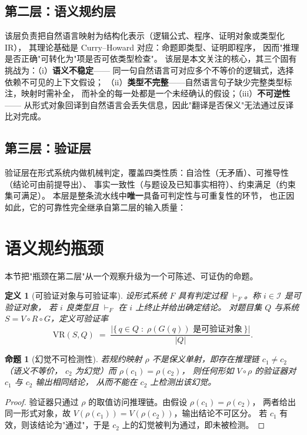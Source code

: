 \documentclass[11pt]{article}
\newtheorem{definition}{定义}[section]
\newtheorem{proposition}{命题}[section]
\newcommand{\IR}{\ensuremath{\mathcal{I}}}
\begin{document}
\subsection{第二层：语义规约层}
该层负责把自然语言映射为结构化表示（逻辑公式、程序、证明对象或类型化 IR），
其理论基础是 Curry--Howard 对应：命题即类型、证明即程序，
因而"推理是否正确"可转化为"项是否可依类型检查"\cite{altenkirch2007observational}。
该层是本文关注的核心，其三个固有挑战为：（i）\textbf{语义不稳定}——
同一句自然语言可对应多个不等价的逻辑式，选择依赖不可见的上下文假设；
（ii）\textbf{类型不完整}——自然语言句子缺少完整类型标注，映射时需补全，
而补全的每一处都是一个未经确认的假设；（iii）\textbf{不可逆性}——
从形式对象回译到自然语言会丢失信息，因此"翻译是否保义"无法通过反译比对完成。

\subsection{第三层：验证层}
验证层在形式系统内做机械判定，覆盖四类性质：自洽性（无矛盾）、可推导性（结论可由前提导出）、
事实一致性（与题设及已知事实相符）、约束满足（约束集可满足）\cite{demoura2008z3,demoura2021lean4}。
本层是整条流水线中\textbf{唯一}具备可判定性与可重复性的环节，
也正因如此，它的可靠性完全继承自第二层的输入质量：\section{语义规约瓶颈}
\label{sec:bottleneck}
本节把"瓶颈在第二层"从一个观察升级为一个可陈述、可证伪的命题。

\begin{definition}[可验证对象与可验证率]
设形式系统 $F$ 具有判定过程 $\vdash_F$。称 $i \in \IR$ 是\emph{可验证对象}，
若 $i$ 良类型且 $\vdash_F$ 在 $i$ 上终止并给出确定结论。
对题目集 $Q$ 与系统 $S = V \circ R \circ G$，定义\emph{可验证率}
\[
\mathrm{VR}(S,Q) \;=\; \frac{\bigl|\{\,q \in Q \;:\; \rho(G(q)) \text{ 是可验证对象}\,\}\bigr|}{|Q|}.
\]
\end{definition}

\begin{proposition}[幻觉不可检测性]
\label{prop:undetectable}
若规约映射 $\rho$ 不是保义单射，即存在推理链 $c_1 \neq c_2$（语义不等价，
$c_2$ 为幻觉）而 $\rho(c_1) = \rho(c_2)$，
则任何形如 $V \circ \rho$ 的验证器对 $c_1$ 与 $c_2$ 输出相同结论，
从而不能在 $c_2$ 上检测出该幻觉。
\end{proposition}
\begin{proof}
验证器只通过 $\rho$ 的取值访问推理链。由假设 $\rho(c_1)=\rho(c_2)$，
两者给出同一形式对象，故 $V(\rho(c_1)) = V(\rho(c_2))$，输出结论不可区分。
若 $c_1$ 有效，则该结论为"通过"，于是 $c_2$ 上的幻觉被判为通过，即未被检测。
\end{proof}
\end{document}
